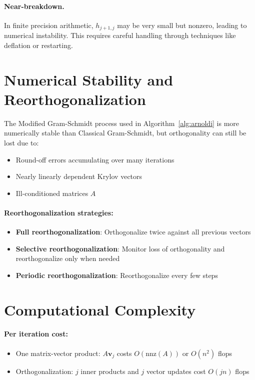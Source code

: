 \paragraph{Near-breakdown.} In finite precision arithmetic, $h_{j+1,j}$ may be very small but nonzero, leading to numerical instability. This requires careful handling through techniques like deflation or restarting.

\section{Numerical Stability and Reorthogonalization}

The Modified Gram-Schmidt process used in Algorithm~\ref{alg:arnoldi} is more numerically stable than Classical Gram-Schmidt, but orthogonality can still be lost due to:
\begin{itemize}
\item Round-off errors accumulating over many iterations
\item Nearly linearly dependent Krylov vectors
\item Ill-conditioned matrices $A$
\end{itemize}

\paragraph{Reorthogonalization strategies:}
\begin{itemize}
\item \textbf{Full reorthogonalization}: Orthogonalize twice against all previous vectors
\item \textbf{Selective reorthogonalization}: Monitor loss of orthogonality and reorthogonalize only when needed
\item \textbf{Periodic reorthogonalization}: Reorthogonalize every few steps
\end{itemize}

\section{Computational Complexity}

\paragraph{Per iteration cost:}
\begin{itemize}
\item One matrix-vector product: $A\mathbf{v}_j$ costs $O(\text{nnz}(A))$ or $O(n^2)$ flops
\item Orthogonalization: $j$ inner products and $j$ vector updates cost $O(jn)$ flops
\end{itemize}

